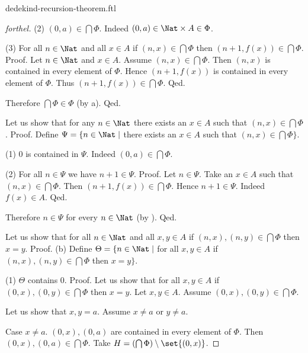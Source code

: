 \documentclass{naproche-library}
\begin{document}
\begin{smodule}{dedekind-recursion-theorem.ftl}
\begin{proof}[forthel]
      (2) $(0, a) \in \bigcap \Phi$. \newline
      Indeed $(0, a) \in \Nat \times A \in \Phi$.

      (3) For all $n \in \Nat$ and all $x \in A$ if $(n, x) \in
      \bigcap \Phi$ then $(n + 1, f(x)) \in \bigcap \Phi$. \newline
      Proof.
        Let $n \in \Nat$ and $x \in A$.
        Assume $(n, x) \in \bigcap \Phi$.
        Then $(n, x)$ is contained in every element of $\Phi$.
        Hence $(n + 1, f(x))$ is contained in every element of $\Phi$.
        Thus $(n + 1, f(x)) \in \bigcap \Phi$.
      Qed.

      Therefore $\bigcap \Phi \in \Phi$ (by a).
    Qed.

    Let us show that for any $n \in \Nat$ there exists an $x \in A$ such
    that $(n, x) \in \bigcap \Phi$. \newline
    Proof.
      Define $\Psi = \{ n \in \Nat \mid$ there exists an $x \in A$ such that
      $(n, x) \in \bigcap \Phi \}$.

      (1) $0$ is contained in $\Psi$.
      Indeed $(0, a) \in \bigcap \Phi$.

      (2) For all $n \in \Psi$ we have $n + 1 \in \Psi$. \newline
      Proof.
        Let $n \in \Psi$.
        Take an $x \in A$ such that $(n, x) \in \bigcap \Phi$.
        Then $(n + 1, f(x)) \in \bigcap \Phi$.
        Hence $n + 1 \in \Psi$.
        Indeed $f(x) \in A$.
      Qed.

      Therefore $n \in \Psi$ for every $n \in \Nat$ (by ).
    Qed.

    Let us show that for all $n \in \Nat$ and all $x, y \in A$ if
    $(n, x), (n, y) \in \bigcap \Phi$ then $x = y$. \newline
    Proof.
      (b) Define $\Theta = \{ n \in \Nat \mid$ for all $x, y \in A$ if
      $(n, x), (n, y) \in \bigcap \Phi$ then $x = y \}$.

      (1) $\Theta$ contains $0$. \newline
      Proof.
        Let us show that for all $x, y \in A$ if $(0, x), (0, y) \in
        \bigcap \Phi$ then $x = y$.
          Let $x, y \in A$.
          Assume $(0, x), (0, y) \in \bigcap \Phi$.

          Let us show that $x, y = a$.
            Assume $x \neq a$ or $y \neq a$.

            Case $x \neq a$.
              $(0,x), (0,a)$ are contained in every element of $\Phi$.
              Then $(0,x), (0,a) \in \bigcap \Phi$.
              Take $H = (\bigcap \Phi) \setminus \set{(0,x)}$.


\end{proof}
\end{smodule}
\end{document}
